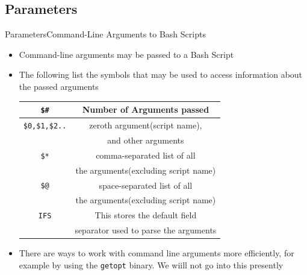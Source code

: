 \documentclass{beamer}
\begin{document}
\subsection{Parameters}
\begin{frame}[fragile]{Parameters}{Command-Line Arguments to Bash
    Scripts} 
  \begin{itemize}
  \item Command-line arguments may be passed to a Bash Script
  \item The following list the symbols that may be used to access
    information about the passed arguments 
    \begin{tabular}{|c|c|}
      \hline
      \verb|$#|&Number of Arguments passed\\
      \hline
      \verb|$0,$1,$2..|&zeroth argument(script name),\\
      &and other arguments\\
      \hline
      \verb|$*|&comma-separated list of all\\
      &the arguments(excluding script name)\\
      \hline
      \verb|$@|&space-separated list of all\\
      &the arguments(excluding script name)\\
      \hline
      \verb|IFS|&This stores the default field\\
      &separator used to parse the arguments\\
      \hline
    \end{tabular}
  \item There are ways to work with command line arguments more
    efficiently, for example by using the \verb|getopt| binary. We
    wiill not go into this presently
  \end{itemize}
\end{frame}
\end{document}
